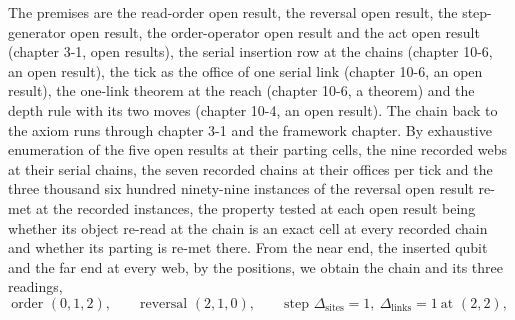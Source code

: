 \begin{chproof}
The premises are the read-order open result, the reversal open result, the step-generator open result, the order-operator open result and the act open result (chapter 3-1, open results), the serial insertion row at the chains (chapter 10-6, an open result), the tick as the office of one serial link (chapter 10-6, an open result), the one-link theorem at the reach (chapter 10-6, a theorem) and the depth rule with its two moves (chapter 10-4, an open result). The chain back to the axiom runs through chapter 3-1 and the framework chapter. By exhaustive enumeration of the five open results at their parting cells, the nine recorded webs at their serial chains, the seven recorded chains at their offices per tick and the three thousand six hundred ninety-nine instances of the reversal open result re-met at the recorded instances, the property tested at each open result being whether its object re-read at the chain is an exact cell at every recorded chain and whether its parting is re-met there. From the near end, the inserted qubit and the far end at every web, by the positions, we obtain the chain and its three readings,
\begin{equation}
\text{order } (0, 1, 2) , \qquad \text{reversal } (2, 1, 0) , \qquad \text{step } \Delta_{\text{sites}} = 1 ,\ \Delta_{\text{links}} = 1 \ \text{at } (2,2) ,
\end{equation}

\end{chproof}
